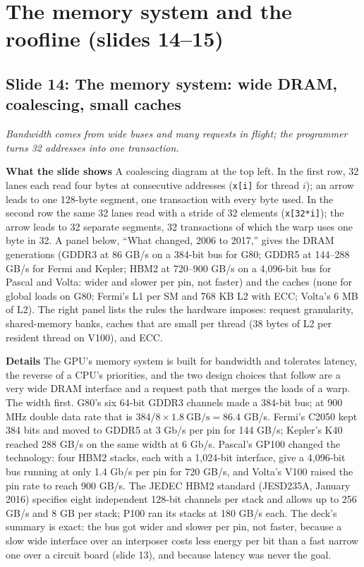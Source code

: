 \documentclass[11pt,letterpaper]{article}
\newcommand{\slide}[3]{%
  \subsection[Slide #1: #2]{Slide #1: #2}%
  {\color{muted}\itshape #3\par}\medskip}
\newcommand{\para}[1]{\medskip\noindent\textbf{#1}\quad}
\begin{document}
\section{The memory system and the roofline (slides 14--15)}

\slide{14}{The memory system: wide DRAM, coalescing, small caches}{Bandwidth comes from wide buses and many requests in flight; the programmer turns 32 addresses into one transaction.}

\para{What the slide shows} A coalescing diagram at the top left. In the first row, 32 lanes each read four bytes at consecutive addresses (\texttt{x[i]} for thread $i$); an arrow leads to one 128-byte segment, one transaction with every byte used. In the second row the same 32 lanes read with a stride of 32 elements (\texttt{x[32*i]}); the arrow leads to 32 separate segments, 32 transactions of which the warp uses one byte in 32. A panel below, ``What changed, 2006 to 2017,'' gives the DRAM generations (GDDR3 at 86 GB/s on a 384-bit bus for G80; GDDR5 at 144--288 GB/s for Fermi and Kepler; HBM2 at 720--900 GB/s on a 4,096-bit bus for Pascal and Volta: wider and slower per pin, not faster) and the caches (none for global loads on G80; Fermi's L1 per SM and 768 KB L2 with ECC; Volta's 6 MB of L2). The right panel lists the rules the hardware imposes: request granularity, shared-memory banks, caches that are small per thread (38 bytes of L2 per resident thread on V100), and ECC.

\para{Details} The GPU's memory system is built for bandwidth and tolerates latency, the reverse of a CPU's priorities, and the two design choices that follow are a very wide DRAM interface and a request path that merges the loads of a warp. The width first. G80's six 64-bit GDDR3 channels made a 384-bit bus; at 900 MHz double data rate that is $384/8 \times 1.8\ \text{GB/s} = 86.4$ GB/s. Fermi's C2050 kept 384 bits and moved to GDDR5 at 3 Gb/s per pin for 144 GB/s; Kepler's K40 reached 288 GB/s on the same width at 6 Gb/s. Pascal's GP100 changed the technology: four HBM2 stacks, each with a 1,024-bit interface, give a 4,096-bit bus running at only 1.4 Gb/s per pin for 720 GB/s, and Volta's V100 raised the pin rate to reach 900 GB/s. The JEDEC HBM2 standard (JESD235A, January 2016) specifies eight independent 128-bit channels per stack and allows up to 256 GB/s and 8 GB per stack; P100 ran its stacks at 180 GB/s each. The deck's summary is exact: the bus got wider and slower per pin, not faster, because a slow wide interface over an interposer costs less energy per bit than a fast narrow one over a circuit board (slide 13), and because latency was never the goal.
\end{document}
